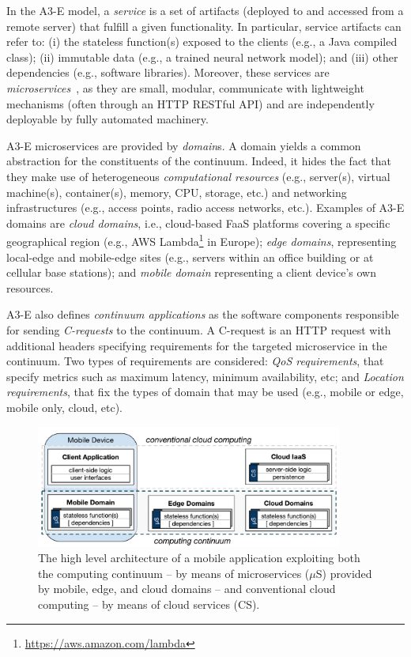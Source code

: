 In the A3-E model, a \textit{service} is a set of artifacts (deployed to and accessed from a remote server) that fulfill a given functionality. In particular, service artifacts can refer to: (i) the stateless function(s) exposed to the clients (e.g., a Java compiled class); (ii) immutable data (e.g., a trained neural network model); and (iii) other dependencies (e.g.,  software libraries). Moreover, these services are \textit{microservices}~\cite{lewis2014microservices}, as they are small, modular, communicate with lightweight mechanisms (often through an HTTP RESTful API) and are independently deployable by fully automated machinery.

A3-E microservices are provided by \textit{domain}s. A domain yields a common abstraction for the constituents of the continuum. Indeed, it hides the fact that they make use of heterogeneous \textit{computational resources} (e.g., server(s), virtual machine(s), container(s), memory, CPU, storage, etc.) and networking infrastructures (e.g., access points, radio access networks, etc.). Examples of A3-E domains are \textit{cloud domains}, i.e., cloud-based FaaS platforms covering a specific geographical region (e.g., AWS Lambda\footnote{\url{https://aws.amazon.com/lambda}} in Europe); \textit{edge domains}, representing local-edge and mobile-edge sites (e.g., servers within an office building or at cellular base stations); and \textit{mobile domain} representing a client device's own resources.

A3-E also defines \textit{continuum applications} as the software components responsible for sending \textit{C-requests} to the continuum. A C-request is an HTTP request with additional headers specifying requirements for the targeted microservice in the continuum. Two types of requirements are considered: \textit{QoS requirements}, that specify metrics such as maximum latency, minimum availability, etc; and \textit{Location requirements}, that fix the types of domain that may be used (e.g., mobile or edge, mobile only, cloud, etc). 

\begin{figure}[tbp]
	\includegraphics[width=0.9\textwidth]{figs/Continuum-arch}
	\caption{The high level architecture of a mobile application exploiting both the computing continuum -- by means of microservices ($\mu$S) provided by mobile, edge, and cloud domains -- and conventional cloud computing -- by means of cloud services (CS).}
	\label{fig:Continuum-arch}
\end{figure}

